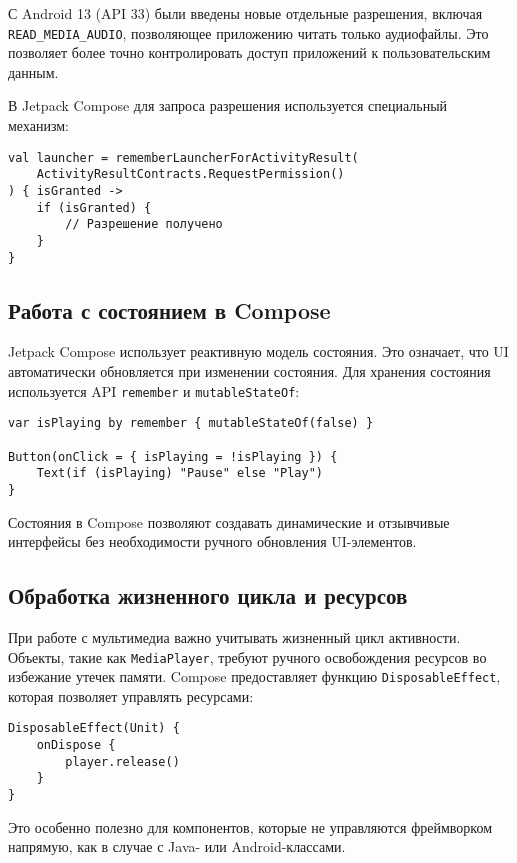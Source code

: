 С Android 13 (API 33) были введены новые отдельные разрешения, включая \texttt{READ\_MEDIA\_AUDIO}\cite{android-permissions}, позволяющее приложению читать только аудиофайлы. Это позволяет более точно контролировать доступ приложений к пользовательским данным.

В Jetpack Compose для запроса разрешения используется специальный механизм:

\begin{lstlisting}
val launcher = rememberLauncherForActivityResult(
    ActivityResultContracts.RequestPermission()
) { isGranted ->
    if (isGranted) {
        // Разрешение получено
    }
}
\end{lstlisting}

\subsection{Работа с состоянием в Compose}

Jetpack Compose использует реактивную модель состояния. Это означает, что UI автоматически обновляется при изменении состояния. Для хранения состояния используется API \texttt{remember} и \texttt{mutableStateOf}:

\begin{lstlisting}
var isPlaying by remember { mutableStateOf(false) }

Button(onClick = { isPlaying = !isPlaying }) {
    Text(if (isPlaying) "Pause" else "Play")
}
\end{lstlisting}

Состояния в Compose позволяют создавать динамические и отзывчивые интерфейсы без необходимости ручного обновления UI-элементов.

\subsection{Обработка жизненного цикла и ресурсов}

При работе с мультимедиа важно учитывать жизненный цикл активности. Объекты, такие как \texttt{MediaPlayer}, требуют ручного освобождения ресурсов во избежание утечек памяти. Compose предоставляет функцию \texttt{DisposableEffect}, которая позволяет управлять ресурсами:

\begin{lstlisting}
DisposableEffect(Unit) {
    onDispose {
        player.release()
    }
}
\end{lstlisting}

Это особенно полезно для компонентов, которые не управляются фреймворком напрямую, как в случае с Java- или Android-классами.

